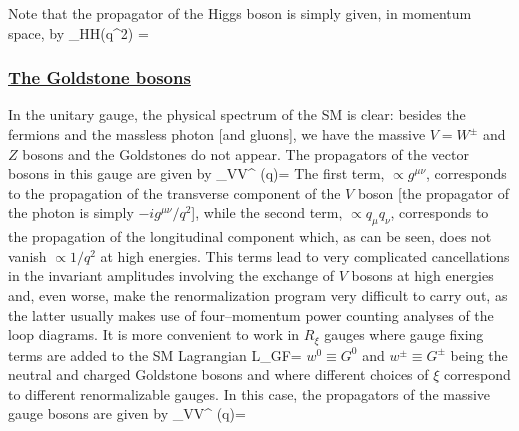 \begin{figure}[h]
\vspace*{-5mm}
\end{figure}

Note that the propagator of the Higgs boson is simply given, in momentum space,
by
\beq
\Delta_{HH}(q^2) =  
\eeq

\subsubsection*{\underline{The Goldstone bosons}}

In the unitary gauge, the physical spectrum of the SM is clear:  besides the
fermions and the massless photon [and gluons], we have the massive $V=W^\pm$ 
and $Z$ bosons and the Goldstones do not appear. The propagators of the vector
bosons in this gauge are given by
\beq
\Delta_{VV}^{\mu \nu} (q)=   
\label{prop-unitary}
\eeq
The first term, $\propto g^{\mu \nu}$, corresponds to the propagation of the
transverse component of the $V$ boson [the propagator of the photon is simply 
$-i g^{\mu \nu}/q^2$], while the second term, $\propto q_\mu q_\nu$, corresponds
to the propagation of the longitudinal component which, as can be seen, does not
vanish $\propto 1/q^2$ at high energies. This terms lead to very complicated
cancellations in the invariant amplitudes involving the exchange of $V$ bosons
at high energies and, even worse, make the renormalization program very
difficult to carry out, as the latter usually makes use of four--momentum power
counting analyses of the loop diagrams. It is more convenient to work in
$R_\xi$ gauges where gauge fixing terms are added to the SM Lagrangian 
\cite{Gauge-Fix}
\beq
{\cal L}_{\rm GF}=  
\eeq
$w^0 \equiv G^0$ and $w^\pm \equiv G^\pm$ being the neutral and charged 
Goldstone bosons and where different choices of $\xi$ correspond to different
renormalizable gauges. In this case, the propagators of the massive gauge 
bosons are given by
\beq
\Delta_{VV}^{\mu \nu} (q)=   
\label{Vpropagator}
